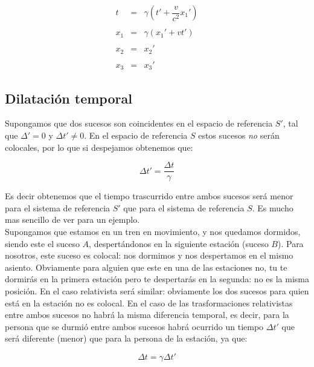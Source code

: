 \documentclass[12pt,a4paper]{book}
\newcommand{\parentesis}[1]{\left( #1  \right)}
\begin{document}
\begin{equation}
\begin{array}{rll}
t & = & \gamma \parentesis{ t' + \dfrac{v}{c^2} x_1'} \\ \\

x_1 & = & \gamma \parentesis{x_1 ' + vt'} \\ \\

x_2  &  = & x_2 ' \\ \\

x_3  & = & x_3'
\end{array}\label{Ec:4.1.2-008}
\end{equation}


\subsection{Dilatación temporal}

Supongamos que dos sucesos son coincidentes en el espacio de referencia $S'$, tal que $\Delta ' = 0$ y $\Delta t' \neq 0$. En el espacio de referencia $S$ estos sucesos \textit{no} serán colocales, por lo que si despejamos obtenemos que:

$$ \Delta t' = \dfrac{\Delta t}{\gamma}$$

Es decir obtenemos que el tiempo trascurrido entre ambos sucesos será menor para el sistema de referencia $S'$ que para el sistema de referencia $S$. Es mucho mas sencillo de ver para un ejemplo. \\

Supongamos que estamos en un tren en movimiento, y nos quedamos dormidos, siendo este el suceso $A$, despertándonos en la siguiente estación (suceso $B$). Para nosotros, este suceso es colocal: nos dormimos y nos despertamos en el mismo asiento. Obviamente para alguien que este en una de las estaciones no, tu te dormirás en la primera estación pero te despertarás en la segunda: no es la misma posición. En el caso relativista será similar: obviamente los dos sucesos para quien está en la estación no es colocal. En el caso de las trasformaciones relativistas entre ambos sucesos no habrá la misma diferencia temporal, es decir, para la persona que se durmió entre ambos sucesos habrá ocurrido un tiempo $\Delta t'$ que será diferente (menor) que para la persona de la estación, ya que:

\begin{equation}
\Delta t = \gamma \Delta t'
\end{equation}
\end{document}
